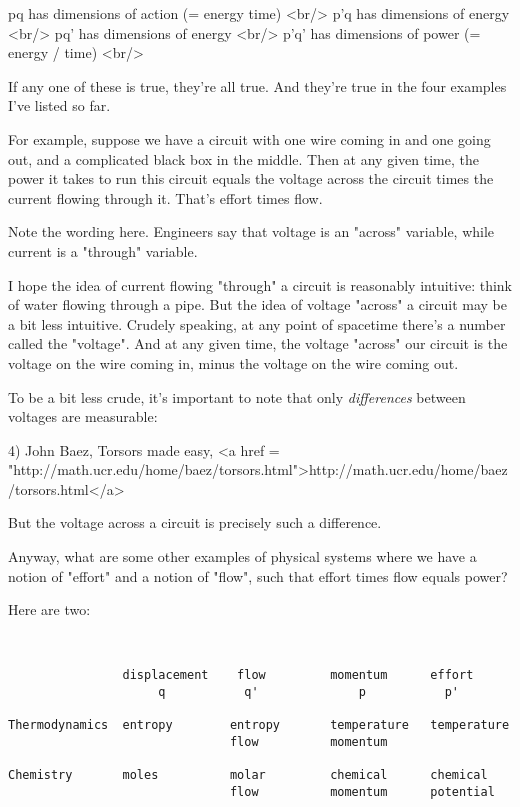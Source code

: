 pq   has dimensions of action (= energy \times  time) <br/>
p'q  has dimensions of energy <br/>
pq'  has dimensions of energy <br/>
p'q' has dimensions of power (= energy / time) <br/>


 If any one of these is true, they're all true.  And they're true
in the four examples I've listed so far.  

For example, suppose we have a circuit with one wire coming in and one
going out, and a complicated black box in the middle.  Then at any
given time, the power it takes to run this circuit equals the voltage
across the circuit times the current flowing through it.  That's
effort times flow.

Note the wording here.  Engineers say that voltage is an "across"
variable, while current is a "through" variable.  

I hope the idea of current flowing "through" a circuit
is reasonably intuitive: think of water flowing through a pipe.  But
the idea of voltage "across" a circuit may be a bit less
intuitive.  Crudely speaking, at any point of spacetime there's a
number called the "voltage".  And at any given time, the
voltage "across" our circuit is the voltage on the wire
coming in, minus the voltage on the wire coming out.

To be a bit less crude, it's important to note that only
\emph{differences} between voltages are measurable:

4) John Baez, Torsors made easy, <a href = "http://math.ucr.edu/home/baez/torsors.html">http://math.ucr.edu/home/baez/torsors.html</a>

But the voltage across a circuit is precisely such a difference.

Anyway, what are some other examples of physical systems where we
have a notion of "effort" and a notion of "flow",
such that effort times flow equals power?

Here are two:



\begin{verbatim}


                displacement    flow         momentum      effort
                     q           q'              p           p'

Thermodynamics  entropy        entropy       temperature   temperature
                               flow          momentum

Chemistry       moles          molar         chemical      chemical
                               flow          momentum      potential

\end{verbatim}
    

